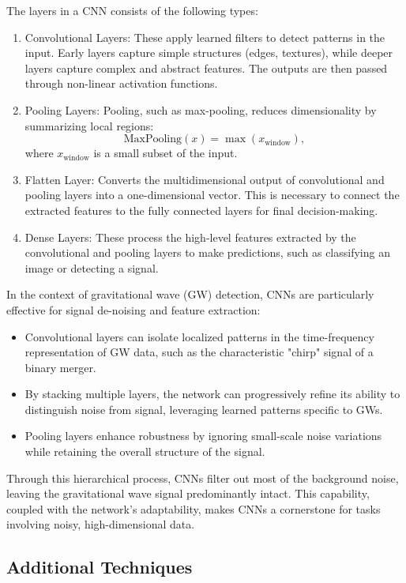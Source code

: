 \documentclass[%
reprint,
amsmath,amssymb,
aps,
]{revtex4-2}
\begin{document}
The layers in a CNN consists of the following types:
\begin{enumerate}
	\item Convolutional Layers: These apply learned filters to detect patterns in the input. Early layers capture simple structures (edges, textures), while deeper layers capture complex and abstract features. The outputs are then passed through non-linear activation functions.
	\item Pooling Layers: Pooling, such as max-pooling, reduces dimensionality by summarizing local regions:
	\[\text{MaxPooling}(x)=\max(x_{\text{window}}),\]
	where \( x_{\text{window}} \) is a small subset of the input.
	\item Flatten Layer: Converts the multidimensional output of convolutional and pooling layers into a one-dimensional vector. This is necessary to connect the extracted features to the fully connected layers for final decision-making.
	\item Dense Layers: These process the high-level features extracted by the convolutional and pooling layers to make predictions, such as classifying an image or detecting a signal.
\end{enumerate}

In the context of gravitational wave (GW) detection, CNNs are particularly effective for signal de-noising and feature extraction:
\begin{itemize}
	\item Convolutional layers can isolate localized patterns in the time-frequency representation of GW data, such as the characteristic "chirp" signal of a binary merger.
	\item By stacking multiple layers, the network can progressively refine its ability to distinguish noise from signal, leveraging learned patterns specific to GWs.
	\item Pooling layers enhance robustness by ignoring small-scale noise variations while retaining the overall structure of the signal.
\end{itemize}

Through this hierarchical process, CNNs filter out most of the background noise, leaving the gravitational wave signal predominantly intact. This capability, coupled with the network's adaptability, makes CNNs a cornerstone for tasks involving noisy, high-dimensional data.




\subsection{Additional Techniques}
\end{document}
